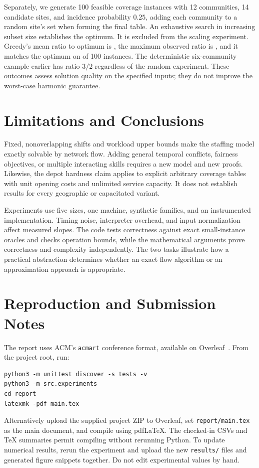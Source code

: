 \documentclass[sigconf,nonacm]{acmart}
\begin{document}
Separately, we generate 100 feasible coverage instances with 12 communities,
14 candidate sites, and incidence probability $0.25$, adding each community
to a random site's set when forming the final table. An exhaustive search
in increasing subset size establishes the optimum. It is excluded from the
scaling experiment. Greedy's mean ratio to optimum is
\QualityMeanRatio{}, the maximum observed ratio is \QualityMaxRatio{}, and
it matches the optimum on \QualityOptimalCount{} of 100 instances.
The deterministic six-community example earlier has ratio $3/2$ regardless
of the random experiment. These outcomes assess solution quality on the
specified inputs; they do not improve the worst-case harmonic guarantee.

\section{Limitations and Conclusions}
Fixed, nonoverlapping shifts and workload upper bounds make the staffing
model exactly solvable by network flow. Adding general temporal conflicts,
fairness objectives, or multiple interacting skills requires a new model and
new proofs. Likewise, the depot hardness claim applies to explicit arbitrary
coverage tables with unit opening costs and unlimited service capacity.
It does not establish results for every geographic or capacitated variant.

Experiments use five sizes, one machine, synthetic families, and an
instrumented implementation. Timing noise, interpreter overhead, and
input normalization affect measured slopes. The code tests correctness
against exact small-instance oracles and checks operation bounds, while
the mathematical arguments prove correctness and complexity independently.
The two tasks illustrate how a practical abstraction determines whether an
exact flow algorithm or an approximation approach is appropriate.




\clearpage
\appendix
\section{Reproduction and Submission Notes}
The report uses ACM's \texttt{acmart} conference format, available on
Overleaf~\cite{template}. From the project root, run:
\begin{Verbatim}[fontsize=\small,breaklines=true]
python3 -m unittest discover -s tests -v
python3 -m src.experiments
cd report
latexmk -pdf main.tex
\end{Verbatim}
Alternatively upload the supplied project ZIP to Overleaf, set
\texttt{report/main.tex} as the main document, and compile using pdfLaTeX.
The checked-in CSVs and TeX summaries permit compiling without rerunning
Python. To update numerical results, rerun the experiment and upload the new
\texttt{results/} files and generated figure snippets together. Do not edit
experimental values by hand.
\end{document}
